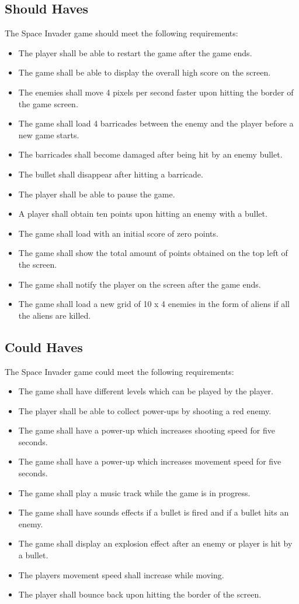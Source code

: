 \subsection{Should Haves}
The Space Invader game should meet the following requirements:
\begin{itemize}
	\item The player shall be able to restart the game after the game ends.
	\item The game shall be able to display the overall high score on the screen.
	\item The enemies shall move 4 pixels per second faster upon hitting the border of the game screen.
	\item The game shall load 4 barricades between the enemy and the player before a new game starts.
	\item The barricades shall become damaged after being hit by an enemy bullet.
	\item The bullet shall disappear after hitting a barricade.
	\item The player shall be able to pause the game.
	\item A player shall obtain ten points upon hitting an enemy with a bullet.
	\item The game shall load with an initial score of zero points.
	\item The game shall show the total amount of points obtained on the top left of the screen.	
	\item The game shall notify the player on the screen after the game ends.	
	\item The game shall load a new grid of 10 x 4 enemies in the form of aliens if all the aliens are killed.
\end{itemize}

\subsection{Could Haves}
The Space Invader game could meet the following requirements:
\begin{itemize}
	\item The game shall have different levels which can be played by the player.
	\item The player shall be able to collect power-ups by shooting a red enemy.
	\item The game shall have a power-up which increases shooting speed for five seconds.
	\item The game shall have a power-up which increases movement speed for five seconds.
	\item The game shall play a music track while the game is in progress.
	\item The game shall have sounds effects if a bullet is fired and if a bullet hits an enemy.
	\item The game shall display an explosion effect after an enemy or player is hit by a bullet.
	\item The players movement speed shall increase while moving.
	\item The player shall bounce back upon hitting the border of the screen.
\end{itemize}

